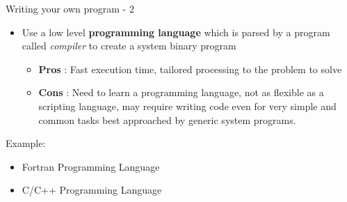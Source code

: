 \documentclass[unknownkeysallowed, 10pt, a4 paper, handout]{beamer}
\begin{document}
\begin{frame}[label=compiled]{Writing your own program - 2}
  \begin{itemize}
    \item Use a low level \textbf{programming language} which is parsed by a
      program called \textit{compiler} to create a system binary program
      \begin{itemize}
        \item \textbf{Pros} : Fast execution time, tailored processing to the
          problem to solve
        \item \textbf{Cons} : Need to learn a programming language, not as
          flexible as a scripting language, may require writing code even
          for very simple and common tasks best approached by generic 
          system programs.
      \end{itemize}
  \end{itemize}
  Example:
  \begin{itemize}
    \item Fortran Programming Language
    \item C/C++ Programming Language
  \end{itemize}
\end{frame}
\end{document}
